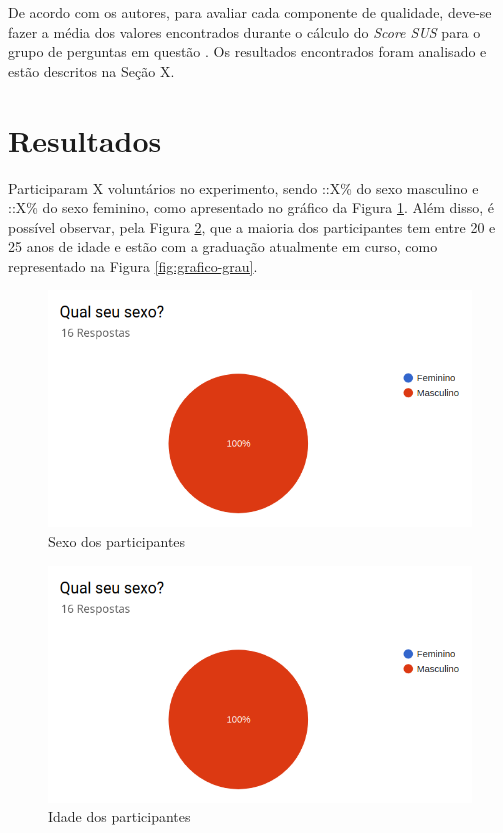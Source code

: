 \par 
De acordo com os autores, para avaliar cada componente de qualidade, deve-se fazer a média dos valores encontrados durante o cálculo do \textit{Score SUS} para o grupo de perguntas em questão \cite{nielsen199510}. Os resultados encontrados foram analisado e estão descritos na Seção X. 

\section{Resultados}
\label{sec:resultados}

Participaram X voluntários no experimento, sendo ::X\% do sexo masculino e ::X\% do sexo feminino, como apresentado no gráfico da Figura \ref{fig:grafico-sexo}. Além disso, é possível observar, pela Figura \ref{fig:grafico-idade}, que a maioria dos participantes tem entre 20 e 25 anos de idade e 
estão com a graduação atualmente em curso, como representado na Figura \ref{fig:grafico-grau}.

\begin{figure}[!ht]
    \centering
    \includegraphics[scale=0.3]{./figuras/grafico_placeholder.png}
    \caption{Sexo dos participantes}
    \label{fig:grafico-sexo}
\end{figure}

\begin{figure}[!ht]
    \centering
    \includegraphics[scale=0.3]{./figuras/grafico_placeholder.png}
    \caption{Idade dos participantes}
    \label{fig:grafico-idade}
\end{figure}

